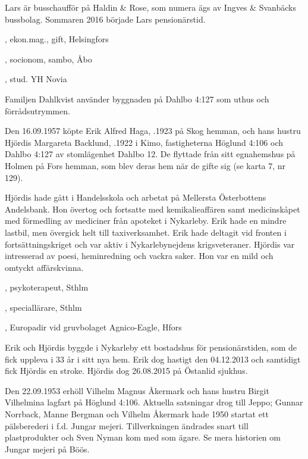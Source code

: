 Lars är busschaufför på Haldin \& Rose, som numera ägs av Ingves \& Svanbäcks bussbolag. Sommaren 2016 började Lars pensionärstid.
\begin{jhchildren}
  \item {}, ekon.mag., gift, Helsingfors
  \item {}, socionom, sambo, Åbo
  \item {}, stud. YH Novia
\end{jhchildren}
Familjen Dahlkvist använder byggnaden på Dahlbo 4:127 som	uthus och förrådsutrymmen.


Den 16.09.1957 köpte Erik Alfred Haga, .1923 på Skog	hemman, och hans hustru Hjördis Margareta Backlund, .1922 i Kimo, fastigheterna Höglund 4:106 och Dahlbo 4:127 av stomlägenhet Dahlbo 12. De flyttade från sitt egnahemshus på Holmen på	Fors hemman, som blev	deras hem när de gifte sig (se karta 7, nr 129).

Hjördis hade gått i	Handelsskola och arbetat på Mellersta Österbottens Andelsbank. Hon övertog och fortsatte med kemikalieaffären samt medicinskåpet med	förmedling av mediciner från apoteket i Nykarleby. Erik hade en mindre lastbil, men övergick helt till taxiverksamhet. Erik hade deltagit vid	fronten i fortsättningskriget och var aktiv i Nykarlebynejdens krigsveteraner. Hjördis var intresserad av poesi, heminredning och	vackra saker. Hon var en mild och omtyckt affärskvinna.
\begin{jhchildren}
  \item {}, psykoterapeut, Sthlm
  \item {}, speciallärare, Sthlm
  \item {}, Europadir vid  gruvbolaget Agnico-Eagle, Hfors
\end{jhchildren}
Erik och Hjördis byggde i Nykarleby ett bostadshus för pensionärstiden,	som de fick uppleva i 33 år i sitt nya hem. Erik dog hastigt den 04.12.2013 och samtidigt fick Hjördis en stroke. Hjördis dog 26.08.2015 på Östanlid sjukhus.


Den 22.09.1953 erhöll Vilhelm Magnus Åkermark och hans hustru	Birgit Vilhelmina lagfart på Höglund 4:106. Aktuella satsningar drog till Jeppo; Gunnar Norrback, Manne Bergman och Vilhelm Åkermark hade 1950 startat ett pälsberederi i f.d. Jungar mejeri. Tillverkningen ändrades snart till plastprodukter och Sven Nyman kom med som ägare. Se mera historien om Jungar mejeri på Böös.

